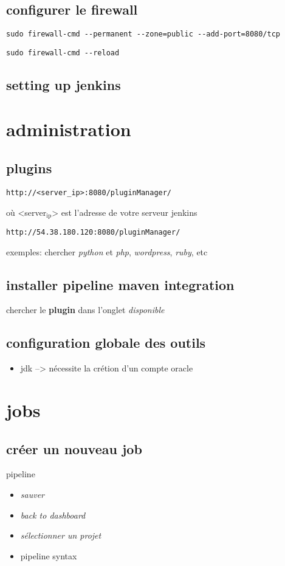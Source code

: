 \documentclass[11pt]{article}
\begin{document}
\subsection{configurer le firewall}
\label{sec-1-3}
\begin{verbatim}
sudo firewall-cmd --permanent --zone=public --add-port=8080/tcp
\end{verbatim}

\begin{verbatim}
sudo firewall-cmd --reload
\end{verbatim}

\subsection{setting up jenkins}
\label{sec-1-4}

\section{administration}
\label{sec-2}
\subsection{plugins}
\label{sec-2-1}
\begin{verbatim}
http://<server_ip>:8080/pluginManager/
\end{verbatim}
où <server$_{\text{ip}}$> est l'adresse de votre serveur jenkins

\begin{verbatim}
http://54.38.180.120:8080/pluginManager/
\end{verbatim}

exemples: chercher \emph{python} et \emph{php}, \emph{wordpress}, \emph{ruby}, etc

\subsection{installer pipeline maven integration}
\label{sec-2-2}
chercher le \textbf{plugin} dans l'onglet \emph{disponible}

\subsection{configuration globale des outils}
\label{sec-2-3}
\begin{itemize}
\item jdk --> nécessite la crétion d'un compte oracle
\end{itemize}
\section{jobs}
\label{sec-3}
\subsection{créer un nouveau job}
\label{sec-3-1}
pipeline
\begin{itemize}
\item \emph{sauver}
\item \emph{back to dashboard}
\item \emph{sélectionner un projet}
\item pipeline syntax
\end{itemize}
\end{document}
